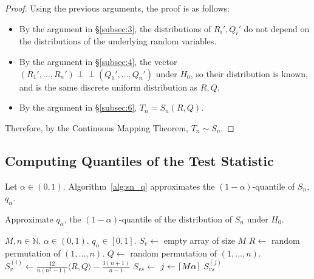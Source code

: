\documentclass[letterpaper, reqno]{amsart}
\numberwithin{equation}{section}
\DeclarePairedDelimiter{\ceil}{\lceil}{\rceil}
\newcommand{\indep}{\perp \!\!\! \perp}  %
\begin{document}
\begin{proof}
  Using the previous arguments, the proof is as follows:
  \begin{itemize}
    \item By the argument in \S\ref{subsec:3}, the distributions of $R_i', Q_i'$ do not depend on the distributions of the underlying random variables.
    \item By the argument in \S\ref{subsec:4}, the vector $(R_1', \dots, R_n')
      \indep (Q_1', \dots, Q_n')$ under $H_0$, so their distribution is known,
      and is the same discrete uniform distribution as $R, Q$.
    \item By the argument in \S\ref{subsec:6}, $T_n = S_n(R, Q)$.
  \end{itemize}
  Therefore, by the Continuous Mapping Theorem, $T_n \sim S_n$.
\end{proof}

\subsection{Computing Quantiles of the Test Statistic}
Let $\alpha \in (0, 1)$. Algorithm~\ref{alg:sn_q} approximates the $(1-\alpha)$-quantile
of $S_n$, $q_\alpha$.

\begin{algorithm}[!h]
  \caption{Approximate $q_\alpha$, the $(1 - \alpha)$-quantile of the
distribution of $S_n$ under $H_0$.}
  \label{alg:sn_q}
  \begin{algorithmic}
    \Require $M, n \in \mathbb{N}$. $\alpha \in (0, 1)$.
    \Ensure $q_\alpha \in [0, 1]$.
      \State $S_v \gets$ empty array of size $M$
        \State $R \gets$ random permutation of $(1, \dots, n)$.
        \State $Q \gets$ random permutation of $(1, \dots, n)$.
        \State $S_v^{(i)} \gets \frac{12}{n(n^2 - 1)} \langle R, Q \rangle - \frac{3(n+1)}{n-1}$
      \EndFor
      \State $S_{vs} \gets$ 
      \State $j \gets \ceil*{M\alpha}$
      \State \Return $S_{vs}^{(j)}$
    \EndProcedure
  \end{algorithmic}
\end{algorithm}
\end{document}
